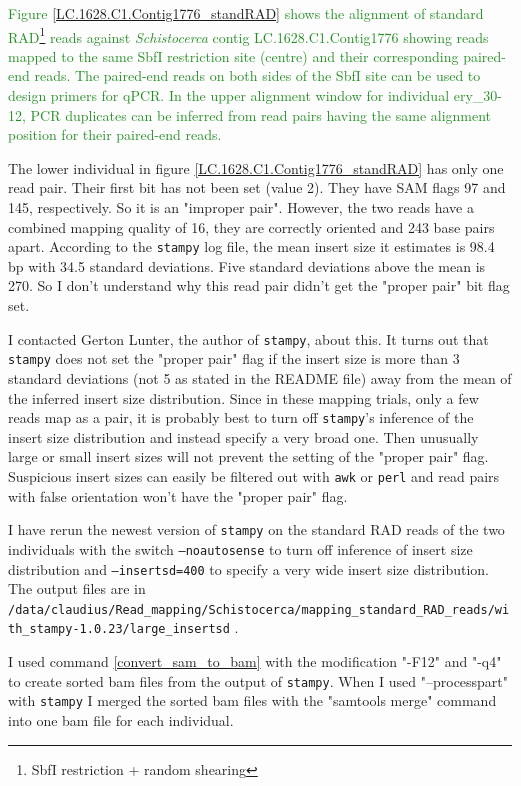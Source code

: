 \documentclass{article}\usepackage[]{graphicx}\usepackage[]{color}
\newcommand{\roger}[1]{ \textcolor[named]{ForestGreen}{#1} }
\begin{document}
\roger{Figure \ref{LC.1628.C1.Contig1776_standRAD} shows the alignment of standard RAD\footnote{SbfI restriction +  random shearing} reads against \textit{Schistocerca} contig LC.1628.C1.Contig1776 showing reads mapped to the same SbfI restriction site (centre) and their corresponding paired-end reads. The paired-end reads on both sides of the SbfI site can be used to design primers for qPCR. In the upper alignment window for individual ery\_30-12, PCR duplicates can be inferred from read pairs having the same alignment position for their paired-end reads.}

The lower individual in figure \ref{LC.1628.C1.Contig1776_standRAD} has only one read pair. Their first bit has not been set (value 2). They have SAM flags 97 and 145, respectively. So it is an "improper pair". However, the two reads have a combined mapping quality of 16, they are correctly oriented and 243 base pairs apart. According to the \texttt{stampy} log file, the mean insert size it estimates is 98.4 bp with 34.5 standard deviations. Five standard deviations above the mean is 270. So I don't understand why this read pair didn't get the "proper pair" bit flag set. 

I contacted Gerton Lunter, the author of \texttt{stampy}, about this. It turns out that \texttt{stampy} does not set the "proper pair" flag if the insert size is more than 3 standard deviations (not 5 as stated in the README file) away from the mean of the inferred insert size distribution. Since in these mapping trials, only a few reads map as a pair, it is probably best to turn off \texttt{stampy}'s inference of the insert size distribution and instead specify a very broad one. Then unusually large or small insert sizes will not prevent the setting of the "proper pair" flag. Suspicious insert sizes can easily be filtered out with \texttt{awk} or \texttt{perl} and read pairs with false orientation won't have the "proper pair" flag.

I have rerun the newest version of \texttt{stampy} on the standard RAD reads of the two individuals with the switch \texttt{--noautosense} to turn off inference of insert size distribution and \texttt{--insertsd=400} to specify a very wide insert size distribution. The output files are in \\{\scriptsize{ \texttt{/data/claudius/Read\_mapping/Schistocerca/mapping\_standard\_RAD\_reads/with\_stampy-1.0.23/large\_insertsd} }}.

I used command \ref{convert_sam_to_bam} with the modification "-F12" and "-q4" to create sorted bam files from the output of \texttt{stampy}. When I used "--processpart" with \texttt{stampy} I merged the sorted bam files with the "samtools merge" command into one bam file for each individual.
\end{document}
